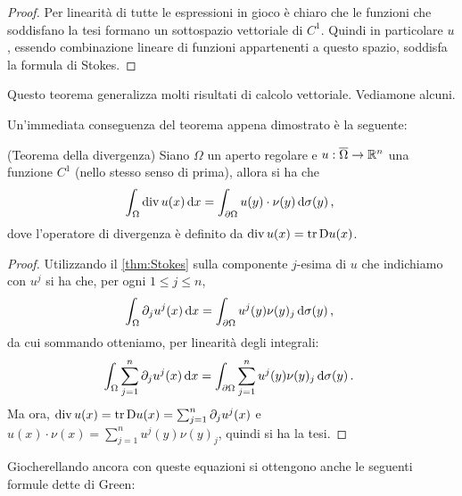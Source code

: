 \begin{proof}
	Per linearità di tutte le espressioni in gioco è chiaro che le funzioni che soddisfano la tesi formano
	un sottospazio vettoriale di $C^1$. Quindi in particolare $u$, essendo combinazione lineare di funzioni appartenenti a questo spazio, soddisfa la formula di Stokes.
\end{proof}

Questo teorema generalizza molti risultati di calcolo vettoriale. Vediamone alcuni.

Un'immediata conseguenza del teorema appena dimostrato è la seguente:

\begin{corollary}(Teorema della divergenza)
	\label{cor:thDivergenza}
	Siano $\Omega$ un aperto regolare e $u:\overline\Omega \rightarrow \mathbb R^n$ una funzione $C^1$ (nello stesso senso di prima), allora si ha che
	\begin{equation}\label{eq:thDivergenza}
		\int_{\Omega} \operatorname{div} u (x) \,\mathrm d x = \int_{\partial \Omega} u(y)\cdot\nu(y) \,\mathrm d \sigma(y)\, \text{, }
	\end{equation}
	dove l'operatore di divergenza è definito da $\operatorname{div} u(x)=\operatorname{tr}\mathrm D u(x)$.
\end{corollary}

\begin{proof}
	Utilizzando il \cref{thm:Stokes} sulla componente $j$-esima di $u$ che indichiamo con $u^j$ si ha che, per ogni $1\leq j\leq n$,
	\[
		\int_{\Omega} \partial_j u^j(x) \,\mathrm d x = \int_{\partial \Omega} u^j(y)\nu(y)_j \,\mathrm d \sigma(y)\, \text{, }
	\]
	da cui sommando otteniamo, per linearità degli integrali:
	\[
		\int_{\Omega} \sum_{j=1}^n\partial_j u^j(x) \,\mathrm d x = \int_{\partial \Omega} \sum_{j=1}^n u^j(y)\nu(y)_j \,\mathrm d \sigma(y)\, \text{. }
	\]
	Ma ora, $\operatorname{div} u (x)= \operatorname{tr}\mathrm D u(x) = \sum_{j=1}^n \partial_j u^j(x)$ e $u(x)\cdot\nu(x)=\sum_{j=1}^n u^j(y)\nu(y)_j$,
	quindi si ha la tesi.
\end{proof}

Giocherellando ancora con queste equazioni si ottengono anche le seguenti formule dette di Green:

